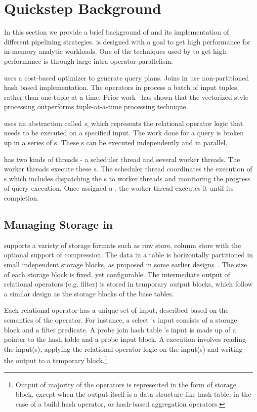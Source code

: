 \section{Quickstep Background}\label{sec:sys-background}
In this section we provide a brief background of \sys{} and its implementation of different pipelining strategies. 
\sys{} is designed with a goal to get high performance for in-memory analytic workloads.
One of the techniques used by \sys{} to get high performance is through large intra-operator parallelism. 

\sys{} uses a cost-based optimizer to generate query plans. 
Joins in \sys{} use non-partitioned hash based implementation. 
The operators in \sys{} process a batch of input tuples, rather than one tuple at a time. 
Prior work~\cite{hyper-pipelining} has shown that the vectorized style processing outperforms tuple-at-a-time processing technique.

\sys{} uses an abstraction called \textit{\wo{}s}, which represents the relational operator logic that needs to be executed on a specified input.
The work done for a query is broken up in a series of \wo{}s.
These \wo{}s can be executed independently and in parallel.

\sys{} has two kinds of threads - a scheduler thread and several worker threads.
The worker threads execute these \wo{}s.
The scheduler thread coordinates the execution of \wo{}s which includes dispatching the \wo{}s to worker threads and monitoring the progress of query execution.
Once assigned a \wo{}, the worker thread executes it until its completion. 

\subsection{Managing Storage in \sys{}}
\sys{} supports a variety of storage formats such as row store, column store with the optional support of compression. 
The data in a table is horizontally partitioned in small independent storage blocks, as proposed in some earlier designs~\cite{quickstep-storage, quickstep-system}. 
The size of each storage block is fixed, yet configurable.
The intermediate output of relational operators (e.g. filter) is stored in temporary output blocks, which follow a similar design as the storage blocks of the base tables. 

Each relational operator \wo{} has a unique set of input, described based on the semantics of the operator.
For instance, a select \wo{}'s input consists of a storage block and a filter predicate.
A probe join hash table \wo{}'s input is made up of a pointer to the hash table and a probe input block.
A \wo{} execution involves reading the input(s), applying the relational operator logic on the input(s) and writing the output to a temporary block.\footnote{Output of majority of the operators is represented in the form of storage block, except when the output itself is a data structure like hash table; in the case of a build hash operator, or hash-based aggregation operators.}

